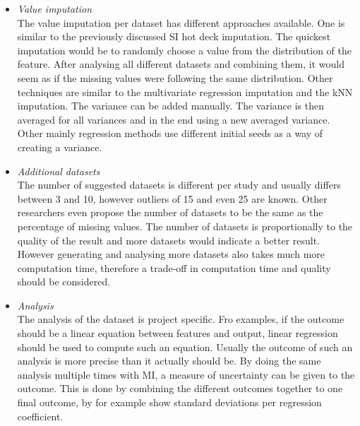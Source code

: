 \documentclass[10pt,a4paper]{article}
\begin{document}
		
	\begin{itemize}
		
		\item \textit{Value imputation} \\
		The value imputation per dataset has different approaches available. One is similar to the previously discussed SI hot deck imputation. The quickest imputation would be to randomly choose a value from the distribution of the feature. After analysing all different datasets and combining them, it would seem as if the missing values were following the same distribution. Other techniques are similar to the multivariate regression imputation and the kNN imputation\cite{pedersen2017missing, white2011multiple}. The variance can be added manually. The variance is then averaged for all variances and in the end using a new averaged variance\cite{donders2006gentle}. Other mainly regression methods use different initial seeds as a way of creating a variance\cite{he2010multiple}.
		
		\item \textit{Additional datasets} \\
		The number of suggested datasets is different per study and usually differs between 3 and 10\cite{van2007multiple, pedersen2017missing, van1999multiple, van2006imputation, azur2011multiple, royston2004multiple}, however outliers of 15\cite{martin2018impact} and even 25\cite{raghunathan2001multivariate} are known. Other researchers even propose the number of datasets to be the same as the percentage of missing values\cite{white2011multiple}. The number of datasets is proportionally to the quality of the result and more datasets would indicate a better result. However generating and analysing more datasets also takes much more computation time, therefore a trade-off in computation time and quality should be considered.
		
		\item \textit{Analysis} \\
		The analysis of the dataset is project specific. Fro examples, if the outcome should be a linear equation between features and output, linear regression should be used to compute such an equation. Usually the outcome of such an analysis is more precise than it actually should be. By doing the same analysis multiple times with MI, a measure of uncertainty can be given to the outcome. This is done by combining the different outcomes together to one final outcome, by for example show standard deviations per regression coefficient\cite{donders2006gentle, van2006imputation}.
		
	\end{itemize}	
\end{document}
